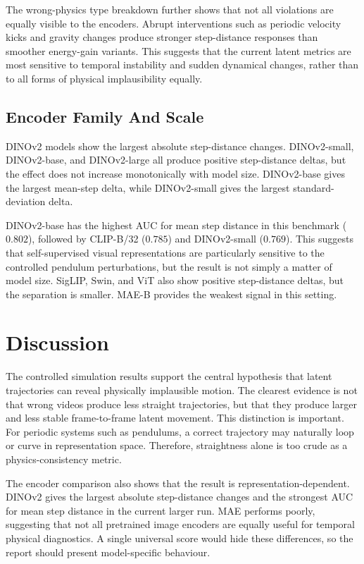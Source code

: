 \documentclass[final-report]{report-template}
\begin{document}
The wrong-physics type breakdown further shows that not all violations are
equally visible to the encoders. Abrupt interventions such as periodic velocity
kicks and gravity changes produce stronger step-distance responses than smoother
energy-gain variants. This suggests that the current latent metrics are most
sensitive to temporal instability and sudden dynamical changes, rather than to
all forms of physical implausibility equally.



\subsection{Encoder Family And Scale}
DINOv2 models show the largest absolute step-distance changes. DINOv2-small,
DINOv2-base, and DINOv2-large all produce positive step-distance deltas, but the
effect does not increase monotonically with model size. DINOv2-base gives the
largest mean-step delta, while DINOv2-small gives the largest standard-deviation
delta.

DINOv2-base has the highest AUC for mean step distance in this benchmark
($0.802$), followed by CLIP-B/32 ($0.785$) and DINOv2-small ($0.769$). This
suggests that self-supervised visual representations are particularly sensitive
to the controlled pendulum perturbations, but the result is not simply a matter
of model size. SigLIP, Swin, and ViT also show positive step-distance deltas,
but the separation is smaller. MAE-B provides the weakest signal in this
setting.

\section{Discussion}
The controlled simulation results support the central hypothesis that latent
trajectories can reveal physically implausible motion. The clearest evidence is
not that wrong videos produce less straight trajectories, but that they produce
larger and less stable frame-to-frame latent movement. This distinction is
important. For periodic systems such as pendulums, a correct trajectory may
naturally loop or curve in representation space. Therefore, straightness alone
is too crude as a physics-consistency metric.

The encoder comparison also shows that the result is representation-dependent.
DINOv2 gives the largest absolute step-distance changes and the strongest AUC
for mean step distance in the current larger run. MAE performs poorly,
suggesting that not all pretrained image encoders are equally useful for
temporal physical diagnostics. A single universal score would hide these
differences, so the report should present model-specific behaviour.
\end{document}

